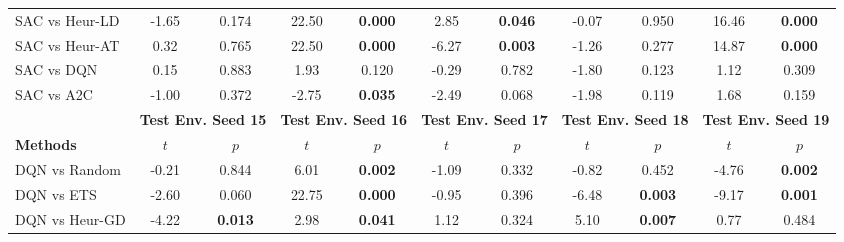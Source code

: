 \begin{tabular}{lcccccccccc}
	SAC vs Heur-LD   & -1.65          & 0.174                  & 22.50          & \textbf{0.000}         & 2.85           & \textbf{0.046}         & -0.07          & 0.950                  & 16.46          & \textbf{0.000}         \\
	SAC vs Heur-AT   & 0.32           & 0.765                  & 22.50          & \textbf{0.000}         & -6.27          & \textbf{0.003}         & -1.26          & 0.277                  & 14.87          & \textbf{0.000}         \\
	SAC vs DQN       & 0.15           & 0.883                  & 1.93           & 0.120                  & -0.29          & 0.782                  & -1.80          & 0.123                  & 1.12           & 0.309                  \\
	SAC vs A2C       & -1.00          & 0.372                  & -2.75          & \textbf{0.035}         & -2.49          & 0.068                  & -1.98          & 0.119                  & 1.68           & 0.159                  \\
	\midrule 
	& \multicolumn{2}{c}{\textbf{Test Env. Seed 15}} & \multicolumn{2}{c}{\textbf{Test Env. Seed 16}} & \multicolumn{2}{c}{\textbf{Test Env. Seed 17}} & \multicolumn{2}{c}{\textbf{Test Env. Seed 18}} & \multicolumn{2}{c}{\textbf{Test Env. Seed 19}} \\
	\cmidrule(lr){2-3} \cmidrule(lr){4-5} \cmidrule(lr){6-7} \cmidrule(lr){8-9} \cmidrule(lr){10-11}
	\textbf{Methods} &$t$               &$p$                          &$t$               &$p$                          &$t$               &$p$                          &$t$               &$p$                          &$t$               &$p$                          \\
	\midrule 
	DQN vs Random    & -0.21          & 0.844                  & 6.01           & \textbf{0.002}         & -1.09          & 0.332                  & -0.82          & 0.452                  & -4.76          & \textbf{0.002}         \\
	DQN vs ETS       & -2.60          & 0.060                  & 22.75          & \textbf{0.000}         & -0.95          & 0.396                  & -6.48          & \textbf{0.003}         & -9.17          & \textbf{0.001}         \\
	DQN vs Heur-GD   & -4.22          & \textbf{0.013}         & 2.98           & \textbf{0.041}         & 1.12           & 0.324                  & 5.10           & \textbf{0.007}         & 0.77           & 0.484                  \\

\end{tabular}
